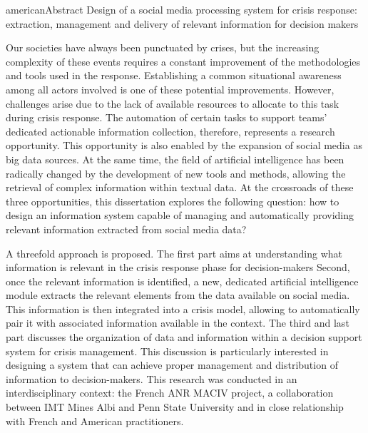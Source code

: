 {american}{Abstract}%
{Design of a social media processing system for crisis response: extraction, management and delivery of relevant information for decision makers}%
{
  Our societies have always been punctuated by crises, but the increasing complexity of these events requires a constant improvement of the methodologies and tools used in the response.
  Establishing a common situational awareness among all actors involved is one of these potential improvements.
  However, challenges arise due to the lack of available resources to allocate to this task during crisis response.
  The automation of certain tasks to support teams' dedicated actionable information collection, therefore, represents a research opportunity.
  This opportunity is also enabled by the expansion of social media as big data sources.
  At the same time, the field of artificial intelligence has been radically changed by the development of new tools and methods, allowing the retrieval of complex information within textual data.
  At the crossroads of these three opportunities, this dissertation explores the following question:
  how to design an information system capable of managing and automatically providing relevant information extracted from social media data?

  A threefold approach is proposed.
  The first part aims at understanding what information is relevant in the crisis response phase for decision-makers
  Second, once the relevant information is identified, a new, dedicated artificial intelligence
  module extracts the relevant elements from the data available on social media.
  This information is then integrated into a crisis model, allowing to automatically
  pair it with associated information available in the context.
  The third and last part discusses the organization of data and information within a decision support system for crisis management.
  This discussion is particularly interested in designing a system that can achieve proper management and distribution of information to decision-makers.
  This research was conducted in an interdisciplinary context: the French ANR MACIV project, a collaboration
  between IMT Mines Albi and Penn State University and in close relationship with French and American practitioners.

}

